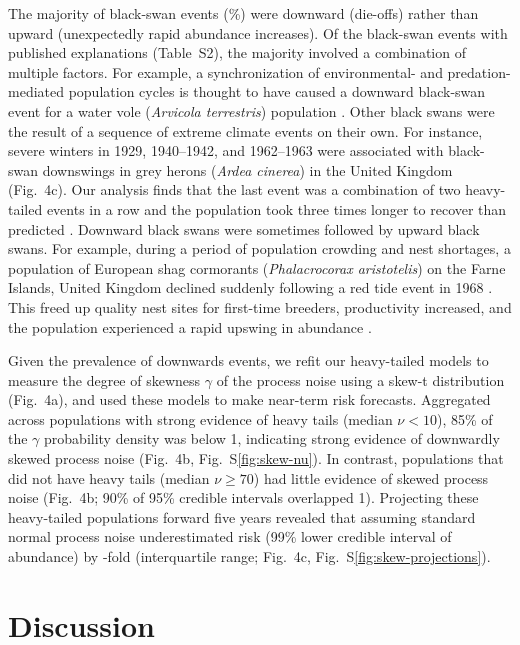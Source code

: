 The majority of black-swan events (\percBSDown \%) were downward (die-offs)
rather than upward (unexpectedly rapid abundance increases). Of the black-swan
events with published explanations (Table~S2), the majority involved
a combination of multiple factors. For example, a synchronization of
environmental- and predation-mediated population cycles is thought to have
caused a downward black-swan event for a water vole (\emph{Arvicola
terrestris}) population \citep{saucy1994}. Other black swans were the result of
a sequence of extreme climate events on their own. For instance, severe winters
in 1929, 1940--1942, and 1962--1963 were associated with black-swan downswings
in grey herons (\emph{Ardea cinerea}) in the United
Kingdom \citep{stafford1971} (Fig.~4c). Our analysis finds that the last event
was a combination of two heavy-tailed events in a row and the population took
three times longer to recover than predicted \citep{stafford1971}. Downward black
swans were sometimes followed by upward black swans. For example, during
a period of population crowding and nest shortages, a population of European
shag cormorants (\emph{Phalacrocorax aristotelis}) on the Farne Islands, United
Kingdom declined suddenly following a red tide event in 1968 \citep{potts1980}.
This freed up quality nest sites for first-time breeders, productivity
increased, and the population experienced a rapid upswing in
abundance \citep{potts1980}.

Given the prevalence of downwards events, we refit our heavy-tailed models to
measure the degree of skewness \(\gamma\) of the process noise using a skew-t
distribution (Fig.~4a), and used these models to make near-term risk forecasts.
Aggregated across populations with strong evidence of heavy tails (median \(\nu
< 10\)), 85\% of the \(\gamma\) probability density was below 1, indicating
strong evidence of downwardly skewed process noise (Fig.~4b,
Fig.~S\ref{fig:skew-nu}). In contrast, populations that did not have heavy
tails (median \(\nu \geq 70\)) had little evidence of skewed process noise
(Fig.~4b; 90\% of 95\% credible intervals overlapped 1). Projecting these
heavy-tailed populations forward five years revealed that assuming standard
normal process noise underestimated risk (99\% lower credible interval of
abundance) by \crashUnderRange-fold (interquartile range; Fig.~4c,
Fig.~S\ref{fig:skew-projections}).

\section{Discussion}

